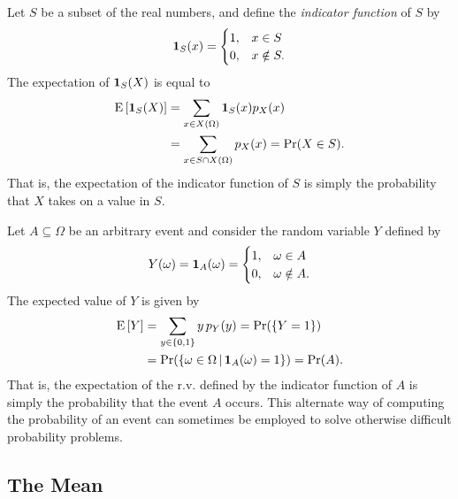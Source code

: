 \begin{example}
Let $S$ be a subset of the real numbers, and define the \emph{indicator function} of $S$ by 
\begin{equation*}
\mathbf{1}_S (x) = \begin{cases} 1, & x \in S\\
0, & x \notin S . \end{cases}
\end{equation*}
The expectation of $\mathbf{1}_S (X)$ is equal to
\begin{equation*}
\begin{split}
\mathrm{E} \left[ \mathbf{1}_S (X) \right]
&= \sum_{x \in X(\Omega)} \mathbf{1}_S (x) p_X(x) \\
&= \sum_{x \in S \cap X(\Omega)} p_X(x)
= \Pr (X \in S) .
\end{split}
\end{equation*}
That is, the expectation of the indicator function of $S$ is simply the probability that $X$ takes on a value in $S$.
\end{example}

\begin{example}
Let $A\subseteq \Omega$ be an arbitrary event and consider the random variable $Y$ defined by
\begin{equation*}
Y(\omega) = \mathbf{1}_A (\omega) = \begin{cases} 1, & \omega \in A\\
0, & \omega \notin A. \end{cases}
\end{equation*}
The expected value of $Y$ is given by
\begin{equation*}
\begin{split}
\mathrm{E} \left[ Y \right]
&= \sum_{y \in \{0,1\}} y \, p_Y (y) = \Pr (\{Y = 1\}) \\
& = \Pr ( \{ \omega \in \Omega\, | \, \mathbf{1}_A (\omega) = 1 \} ) = \Pr (A ).
\end{split}
\end{equation*}
That is, the expectation of the r.v. defined by the indicator function of $A$ is simply the probability that the event $A$ occurs.
This alternate way of computing the probability of an event can sometimes be employed to solve otherwise difficult probability problems.
\end{example}

\subsection{The Mean}

